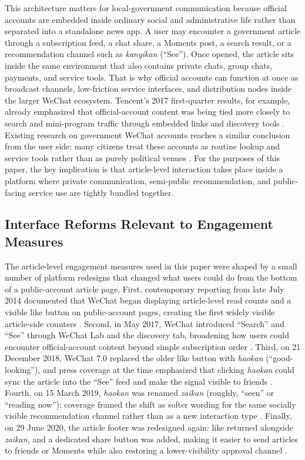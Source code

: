 \documentclass[12pt, american]{article}
\begin{document}
This architecture matters for local-government communication because official accounts are embedded inside ordinary social and administrative life rather than separated into a standalone news app. A user may encounter a government article through a subscription feed, a chat share, a Moments post, a search result, or a recommendation channel such as \textit{kanyikan} (``See''). Once opened, the article sits inside the same environment that also contains private chats, group chats, payments, and service tools. That is why official accounts can function at once as broadcast channels, low-friction service interfaces, and distribution nodes inside the larger WeChat ecosystem. Tencent's 2017 first-quarter results, for example, already emphasized that official-account content was being tied more closely to search and mini-program traffic through embedded links and discovery tools \parencite{Tencent2017Q1Results}. Existing research on government WeChat accounts reaches a similar conclusion from the user side: many citizens treat these accounts as routine lookup and service tools rather than as purely political venues \parencite{JiangEtAl2021,LiuMaXia2024,YuShen2026}. For the purposes of this paper, the key implication is that article-level interaction takes place inside a platform where private communication, semi-public recommendation, and public-facing service use are tightly bundled together.

\subsection{Interface Reforms Relevant to Engagement Measures}

The article-level engagement measures used in this paper were shaped by a small number of platform redesigns that changed what users could do from the bottom of a public-account article page. First, contemporary reporting from late July 2014 documented that WeChat began displaying article-level read counts and a visible like button on public-account pages, creating the first widely visible article-side counters \parencite{People2014ReadLike}. Second, in May 2017, WeChat introduced ``Search'' and ``See'' through WeChat Lab and the discovery tab, broadening how users could encounter official-account content beyond simple subscription order \parencite{Sina2017SearchSee,Tencent2017Q1Results}. Third, on 21 December 2018, WeChat 7.0 replaced the older like button with \textit{haokan} (``good-looking''), and press coverage at the time emphasized that clicking \textit{haokan} could sync the article into the ``See'' feed and make the signal visible to friends \parencite{Zhoudao2018Haokan}. Fourth, on 15 March 2019, \textit{haokan} was renamed \textit{zaikan} (roughly, ``seen'' or ``reading now''); coverage framed the shift as softer wording for the same socially visible recommendation channel rather than as a new interaction type \parencite{TechNode2019Zaikan}. Finally, on 29 June 2020, the article footer was redesigned again: like returned alongside \textit{zaikan}, and a dedicated share button was added, making it easier to send articles to friends or Moments while also restoring a lower-visibility approval channel \parencite{STCN2020LikeReturn}.
\end{document}
